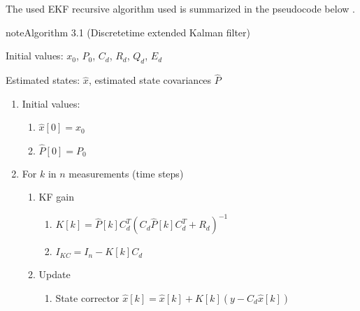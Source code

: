 \documentclass[review]{elsarticle}
\begin{document}
The used EKF recursive algorithm used is summarized in the pseudocode below \cite{brown_introduction_1997}.
\label{04.01_EK:ek-algorithm}
\begin{sphinxadmonition}{note}{Algorithm 3.1 (Discrete\sphinxhyphen{}time extended Kalman filter)}



  
 Initial values: \(x_0\), \(P_0\), \(C_d\), \(R_d\), \(Q_d\), \(E_d\)

  
 Estimated states: \(\hat{x}\), estimated state covariances \(\hat{P}\)
\begin{enumerate}
%
\item {} 
  
Initial values:
\begin{enumerate}
%
\item {} 
  
\(\hat{x}[0] = x_0\)

\item {} 
  
\(\hat{P}[0] = P_0\)

\end{enumerate}

\item {} 
  
For \(k\) in \(n\) measurements (time steps)
\begin{enumerate}
%
\item {} 
  
KF gain
\begin{enumerate}
%
\item {} 
  
\(K[k]=\hat{P}[k] C_d^T \left(C_d \hat{P}[k] C_d^T + R_d\right)^{-1}\)

\item {} 
  
\(I_{KC} = I_n - K[k] C_d\)

\end{enumerate}

\item {} 
  
Update
\begin{enumerate}
%
\item {} 
  
State corrector
\(\hat{x}[k] = \hat{x}[k] + K[k] (y - C_d \hat{x}[k]) \)


\end{enumerate}
\end{enumerate}
\end{enumerate}
\end{sphinxadmonition}
\end{document}
